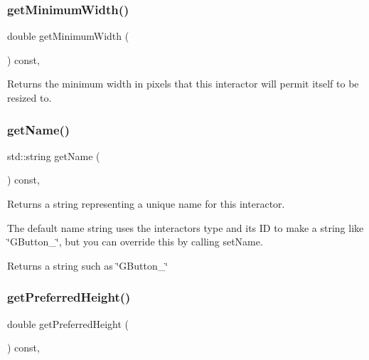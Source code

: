 \subsubsection{\texorpdfstring{get\+Minimum\+Width()}{getMinimumWidth()}}
{\footnotesize\ttfamily double get\+Minimum\+Width (\begin{DoxyParamCaption}{ }\end{DoxyParamCaption}) const\hspace{0.3cm}{\ttfamily [virtual]}, {\ttfamily [inherited]}}



Returns the minimum width in pixels that this interactor will permit itself to be resized to. 

\mbox{\label{classsgl_1_1GInteractor_a8a60438a5b55d0b2ceb35c8674b9d8c5}} 
\subsubsection{\texorpdfstring{get\+Name()}{getName()}}
{\footnotesize\ttfamily std\+::string get\+Name (\begin{DoxyParamCaption}{ }\end{DoxyParamCaption}) const\hspace{0.3cm}{\ttfamily [virtual]}, {\ttfamily [inherited]}}



Returns a string representing a unique name for this interactor. 

The default name string uses the interactor\textquotesingle{}s type and its ID to make a string like \char`\"{}\+G\+Button\+\_\char`\"{}, but you can override this by calling set\+Name. \begin{DoxyReturn}{Returns}
a string such as \char`\"{}\+G\+Button\+\_\char`\"{} 
\end{DoxyReturn}
\mbox{\label{classsgl_1_1GInteractor_a747de0961653847bdc6615dbf756d715}} 
\subsubsection{\texorpdfstring{get\+Preferred\+Height()}{getPreferredHeight()}}
{\footnotesize\ttfamily double get\+Preferred\+Height (\begin{DoxyParamCaption}{ }\end{DoxyParamCaption}) const\hspace{0.3cm}{\ttfamily [virtual]}, {\ttfamily [inherited]}}



